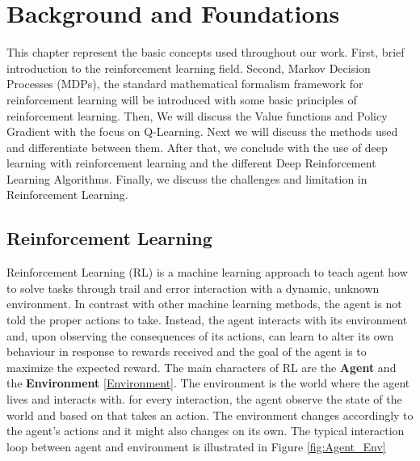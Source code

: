 
\chapter{Background and Foundations}\label{chapter:Background and Foundations}

This chapter represent the basic concepts used throughout our work. First, brief introduction to the reinforcement learning field. Second, Markov Decision Processes (MDPs), the standard mathematical formalism framework for reinforcement learning will be introduced with some basic principles of reinforcement learning. Then, We will discuss the Value functions and Policy Gradient with the focus on Q-Learning. Next we will discuss the methods used and differentiate between them. After that, we conclude with the use of deep learning with reinforcement learning and the different Deep Reinforcement Learning Algorithms. Finally, we discuss the challenges and limitation in Reinforcement Learning.

\section{Reinforcement Learning}
Reinforcement Learning (RL) is a machine learning approach to teach agent how to solve tasks through trail and error interaction with a dynamic, unknown environment. In contrast with other machine learning methods, the agent is not told the proper actions to take. Instead, the agent interacts with its environment and, upon observing the consequences of its actions, can learn to alter its own behaviour in response to rewards received and the goal of the agent is to maximize the expected reward. The main characters of RL are the \textbf{Agent} and the \textbf{Environment} \ref{Environment}. The environment is the world where the agent lives and interacts with. for every interaction, the agent observe the state of the world and based on that takes an action. The environment changes accordingly to the agent's actions and it might also changes on its own. The typical interaction loop between agent and environment is illustrated in Figure \ref{fig:Agent_Env}


